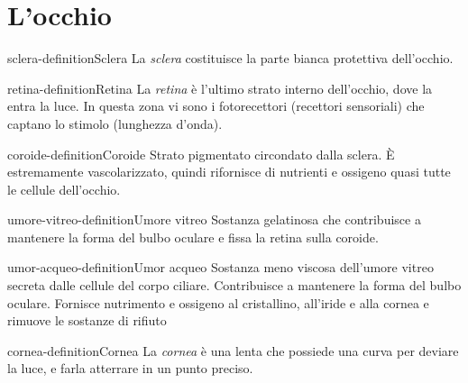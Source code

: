 \documentclass[preview]{standalone}
\begin{document}
\genpage

\section{L'occhio}




\begin{snippetdefinition}{sclera-definition}{Sclera}
    La \textit{sclera} costituisce la parte bianca protettiva dell'occhio.
\end{snippetdefinition}

\begin{snippetdefinition}{retina-definition}{Retina}
    La \textit{retina} è l'ultimo strato interno dell'occhio, dove la entra la luce.
    In questa zona vi sono i fotorecettori (recettori sensoriali) che captano lo stimolo (lunghezza d'onda).
\end{snippetdefinition}

\begin{snippetdefinition}{coroide-definition}{Coroide}
    Strato pigmentato circondato dalla sclera. È estremamente vascolarizzato, quindi rifornisce
    di nutrienti e ossigeno quasi tutte le cellule dell'occhio.
\end{snippetdefinition}

\begin{snippetdefinition}{umore-vitreo-definition}{Umore vitreo}
    Sostanza gelatinosa che contribuisce a mantenere la forma del bulbo oculare e fissa la
    retina sulla coroide.
\end{snippetdefinition}

\begin{snippetdefinition}{umor-acqueo-definition}{Umor acqueo}
    Sostanza meno viscosa dell'umore vitreo secreta dalle cellule del corpo ciliare. Contribuisce
    a mantenere la forma del bulbo oculare. Fornisce nutrimento e ossigeno al cristallino,
    all'iride e alla cornea e rimuove le sostanze di rifiuto
\end{snippetdefinition}

\begin{snippetdefinition}{cornea-definition}{Cornea}
    La \textit{cornea} è una lenta che possiede una curva per deviare la luce, e farla atterrare in un punto preciso.
\end{snippetdefinition}
\end{document}
